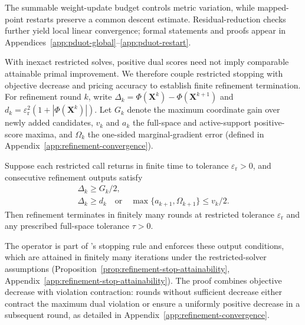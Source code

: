 The summable weight-update budget controls metric variation, while mapped-point restarts preserve a common descent estimate.
Residual-reduction checks further yield local linear convergence; formal statements and proofs appear in Appendices~\ref{app:pduot-global}--\ref{app:pduot-restart}.

With inexact restricted solves, positive dual scores need not imply comparable attainable primal improvement.
We therefore couple restricted stopping with objective decrease and pricing accuracy to establish finite refinement termination.
For refinement round $k$, write $\Delta_k=\Phi(\mathbf X^k)-\Phi(\mathbf X^{k+1})$ and $d_k=\varepsilon_{\mathrm r}^2(1+|\Phi(\mathbf X^k)|)$.
Let $G_k$ denote the maximum coordinate gain over newly added candidates, $v_k$ and $a_k$ the full-space and active-support positive-score maxima, and $\Omega_k$ the one-sided marginal-gradient error (defined in Appendix~\ref{app:refinement-convergence}).

\begin{theorem}
\label{thm:refinement}
Suppose each restricted call returns in finite time to tolerance $\varepsilon_{\mathrm r}>0$, and consecutive refinement outputs satisfy
\begin{equation*}
\begin{gathered}
\Delta_k\geq G_k/2,\\
\Delta_k\geq d_k
\quad\text{or}\quad
\max\{a_{k+1},\Omega_{k+1}\}\leq v_k/2.
\end{gathered}
\end{equation*}
Then refinement terminates in finitely many rounds at restricted tolerance $\varepsilon_{\mathrm r}$ and any prescribed full-space tolerance $\tau>0$.
\end{theorem}

The \checkstop operator is part of \subsolver's stopping rule and enforces these output conditions, which are attained in finitely many iterations under the restricted-solver assumptions (Proposition~\ref{prop:refinement-stop-attainability}, Appendix~\ref{app:refinement-stop-attainability}).
The proof combines objective decrease with violation contraction: rounds without sufficient decrease either contract the maximum dual violation or ensure a uniformly positive decrease in a subsequent round, as detailed in Appendix~\ref{app:refinement-convergence}.


